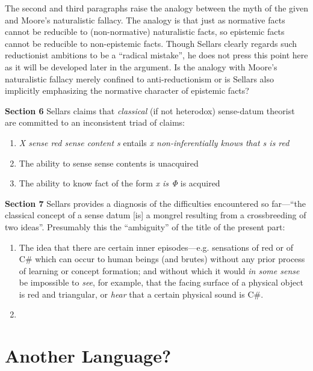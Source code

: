\documentclass[11pt]{article}
\begin{document}
The second and third paragraphs raise the analogy between the myth of the given and Moore's naturalistic fallacy. The analogy is that just as normative facts cannot be reducible to (non-normative) naturalistic facts, so epistemic facts cannot be reducible to non-epistemic facts. Though Sellars clearly regards such reductionist ambitions to be a ``radical mistake'', he does not press this point here as it will be developed later in the argument. Is the analogy with Moore's naturalistic fallacy merely confined to anti-reductionism or is Sellars also implicitly emphasizing the normative character of epistemic facts?

\textbf{Section 6} Sellars claims that \emph{classical} (if not heterodox) sense-datum theorist are committed to an inconsistent triad of claims:
\begin{enumerate}
    \item \emph{X sense red sense content s} entails \emph{x non-inferentially knows that s is red}
    \item The ability to sense sense contents is unacquired
    \item The ability to know fact of the form \emph{x is Φ} is acquired
\end{enumerate}

\textbf{Section 7} Sellars provides a diagnosis of the difficulties encountered so far---``the classical concept of a sense datum [is] a mongrel resulting from a crossbreeding of two ideas''. Presumably this the ``ambiguity'' of the title of the present part:
\begin{enumerate}
    \item The idea that there are certain inner episodes---e.g. sensations of red or of C# which can occur to human beings (and brutes) without any prior process of learning or concept formation; and without which it would \emph{in some sense} be impossible to \emph{see}, for example, that the facing surface of a physical object is red and triangular, or \emph{hear} that a certain physical sound is C#.
    \item 
\end{enumerate}


\section{Another Language?} %
\label{sec:another_language_}

\end{document}
